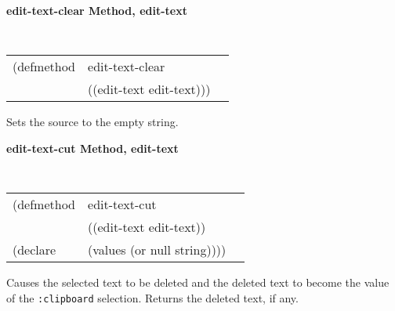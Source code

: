 {\samepage  
{\large {\bf edit-text-clear \hfill Method, edit-text}}
\begin{flushright} \parbox[t]{6.125in}{
\tt
\begin{tabular}{lll}
\raggedright
(defmethod & edit-text-clear & \\
& ((edit-text  edit-text)))
\end{tabular}
\rm

}\end{flushright}}



\begin{flushright} \parbox[t]{6.125in}{
Sets the source to the empty string.}
\end{flushright}

{\samepage
{\large {\bf edit-text-cut \hfill Method, edit-text}}
\begin{flushright} \parbox[t]{6.125in}{
\tt
\begin{tabular}{lll}
\raggedright
(defmethod & edit-text-cut & \\
           & ((edit-text  edit-text)) \\
(declare   & (values (or null string))))
\end{tabular}
\rm

}\end{flushright}}

\begin{flushright} \parbox[t]{6.125in}{
Causes the selected text to be deleted and the deleted text to become the value
of the {\tt :clipboard} selection.
Returns the deleted text, if any. 

}\end{flushright}



